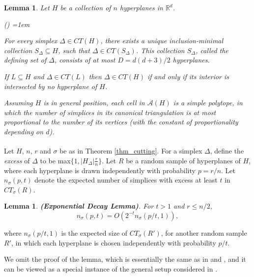 \documentclass[11pt]{article}
\newtheorem{lemma}[theorem]{Lemma}
\newcounter{itemcounter}
\def\reals{\mathbb R}
\begin{document}
\begin{lemma} \label{lemma_triangulation} Let $H$ be a collection of $n$ hyperplanes in $\reals^{d}$.
\begin{list} {\emph{()}}{ \leftmargin=1em}
\item \emph{\cite{cf90}} For every simplex $\Delta \in CT(H)$, there exists a unique inclusion-minimal collection $S_{\Delta} \subseteq H$, such that $\Delta \in CT(S_{\Delta})$. This collection $S_{\Delta}$, called the \emph{defining set} of $\Delta$, consists of at most $D = d(d+3)/2$ hyperplanes.
\item \emph{\cite{cf90}} If $L \subseteq H$ and $\Delta \in CT(L)$ then $\Delta \in CT(H)$ if and only if its interior is intersected by no hyperplane of $H$.
\item \emph{\cite{mat02}} Assuming $H$ is in general position, each cell in $\mathcal{A}(H)$ is a simple polytope, in which the number of simplices in its canonical triangulation is at most proportional to the number of its vertices (with the constant of proportionality depending on $d$).
\end{list}
\end{lemma}

\paragraph{}

Let $H$, $n$, $r$ and $\sigma$ be as in Theorem \ref{thm_cutting}. For a simplex $\Delta$, define the \emph{excess} of $\Delta$ to be max$\{1, |H_{\Delta}|\frac{r}{n}\}$. Let $R$ be a random sample of hyperplanes of $H$, where each hyperplane is drawn independently with probability $p = r/n$. Let $n_{\sigma}(p,t)$ denote the expected number of simplices with excess at least $t$ in $CT_{\sigma}(R)$.

\begin{lemma}\label{npt_lemma}
\emph{{\bf(Exponential Decay Lemma)}}. For $t > 1$ and $r \leq n/2$,
$$n_{\sigma}(p, t) = O(2^{-t}n_{\sigma}(p/t, 1)),$$
\end{lemma}
where $n_{\sigma}(p/t, 1)$ is the expected size of $CT_{\sigma}(R')$, for another random sample $R'$, in which each hyperplane is chosen independently with probability $p/t$.

We omit the proof of the lemma, which is essentially the same as in \cite{mat92a} and \cite{mat92b}, and it can be viewed as a special instance of the general setup considered in \cite{ams98}.
\end{document}
